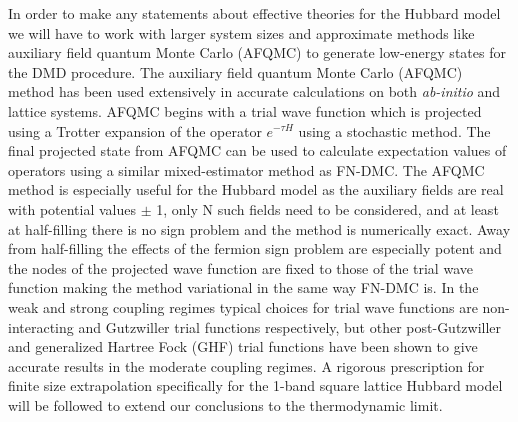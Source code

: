 \documentclass[12pt]{article}
\begin{document}
In order to make any statements about effective theories for the Hubbard model we will have to work with larger system sizes and approximate methods like auxiliary field quantum Monte Carlo (AFQMC) to generate low-energy states for the DMD procedure.
The auxiliary field quantum Monte Carlo (AFQMC) method has been used extensively in accurate calculations on both \textit{ab-initio} and lattice systems.
AFQMC begins with a trial wave function which is projected using a Trotter expansion of the operator $e^{-\tau H}$ using a stochastic method.
The final projected state from AFQMC can be used to calculate expectation values of operators using a similar mixed-estimator method as FN-DMC.
The AFQMC method is especially useful for the Hubbard model as the auxiliary fields are real with potential values $\pm$ 1, only N such fields need to be considered, and at least at half-filling there is no sign problem and the method is numerically exact. 
Away from half-filling the effects of the fermion sign problem are especially potent and the nodes of the projected wave function are fixed to those of the trial wave function making the method variational in the same way FN-DMC is.
In the weak and strong coupling regimes typical choices for trial wave functions are non-interacting and Gutzwiller trial functions respectively, but other post-Gutzwiller and generalized Hartree Fock (GHF) trial functions have been shown to give accurate results in the moderate coupling regimes.
A rigorous prescription for finite size extrapolation specifically for the 1-band square lattice Hubbard model will be followed to extend our conclusions to the thermodynamic limit.
\end{document}
